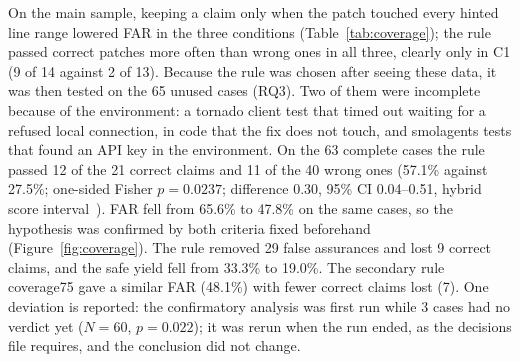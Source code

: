 \documentclass[ai,article,submit,oneauthor]{Definitions/mdpi}
\begin{document}
On the main sample, keeping a claim only when the patch touched every hinted line range lowered FAR in the three conditions (Table~\ref{tab:coverage}); the rule passed correct patches more often than wrong ones in all three, clearly only in C1 (9 of 14 against 2 of 13). Because the rule was chosen after seeing these data, it was then tested on the 65 unused cases (RQ3). Two of them were incomplete because of the environment: a tornado client test that timed out waiting for a refused local connection, in code that the fix does not touch, and smolagents tests that found an API key in the environment. On the 63 complete cases the rule passed 12 of the 21 correct claims and 11 of the 40 wrong ones (57.1\% against 27.5\%; one-sided Fisher $p=0.0237$; difference 0.30, 95\% CI 0.04--0.51, hybrid score interval~\cite{Newcombe1998IntervalEstimationIndependent}). FAR fell from 65.6\% to 47.8\% on the same cases, so the hypothesis was confirmed by both criteria fixed beforehand (Figure~\ref{fig:coverage}). The rule removed 29 false assurances and lost 9 correct claims, and the safe yield fell from 33.3\% to 19.0\%. The secondary rule coverage75 gave a similar FAR (48.1\%) with fewer correct claims lost (7). One deviation is reported: the confirmatory analysis was first run while 3 cases had no verdict yet ($N=60$, $p=0.022$); it was rerun when the run ended, as the decisions file requires, and the conclusion did not change.
\end{document}
